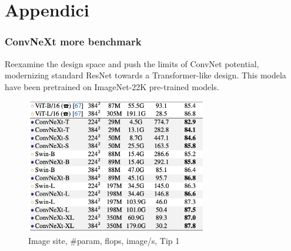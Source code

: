 \section{Appendici}

\begin{frame}
\frametitle{ConvNeXt more benchmark}
Reexamine the design space and push the limits of ConvNet potential, modernizing  standard ResNet towards a Transformer-like design.
This modela have been pretrained on ImageNet-22K pre-trained models.


\begin{figure}[h]
    \centering
    \includegraphics[width=0.7\textwidth]{img/4-section/ConvNext2.png}
    \caption{Image site, #param, flops, image/s, Tip 1}
\end{figure}

\end{frame}









